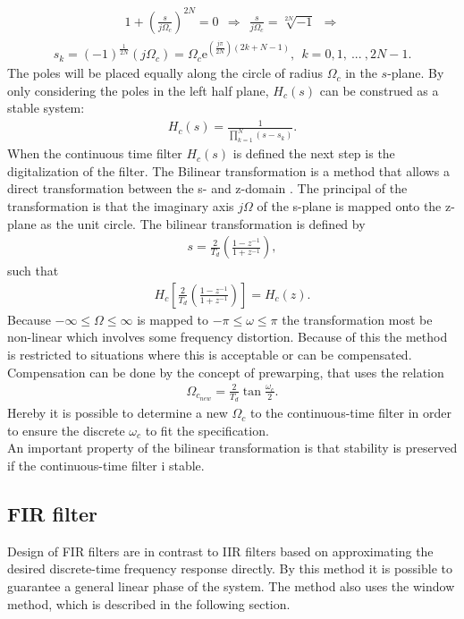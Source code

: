 \begin{align}
1+\left( \frac{s}{j\Omega_c}\right)^{2N} = 0 \ \  \Rightarrow  \ \ \frac{s}{j \Omega_c} = \sqrt[2N]{-1} \ \
\Rightarrow 
\end{align}
\begin{align}
s_k = (-1)^{\frac{1}{2N}}\left(j\Omega_c\right)=\Omega_c\text{e}^{\left(\frac{j\pi}{2N}\right)\left(2k+N-1\right)}, \ \ k=0,1,\ ... \ , 2N-1.
\end{align}   
The poles will be placed equally along the circle of radius $\Omega_c$ in the $s$-plane. By only considering the poles in the left half plane, $H_c(s)$ can be construed as a stable system:
\begin{align}
H_c(s)=\frac{1}{\prod_{k=1}^{N}(s-s_k)}.
\end{align}    
When the continuous time filter $H_c(s)$ is defined the next step is the digitalization of the filter.  The Bilinear transformation is a method that allows a direct transformation between the s- and z-domain . The principal of the transformation is that the imaginary axis $j\Omega$ of the s-plane is mapped onto the z-plane as the unit circle. The bilinear transformation is defined by 
\begin{align}
s=\frac{2}{T_d}\left(\frac{1-z^{-1}}{1+z^{-1}}\right), 
\end{align}
such that 
\begin{align}
H_c\left[\frac{2}{T_d}\left(\frac{1-z^{-1}}{1+z^{-1}}\right)\right]=H_c(z). 
\end{align}  
Because $-\infty \leq \Omega \leq \infty $ is mapped to $-\pi \leq \omega \leq \pi$ the transformation most be non-linear which involves some frequency distortion. Because of this the method is restricted to situations where this is acceptable or can be compensated. Compensation can be done by the concept of prewarping, that uses the relation 
\begin{align}
\Omega_{c_{new}}=\frac{2}{T_d}\tan\frac{\omega_c}{2}.
\end{align}
Hereby it is possible to determine a new $\Omega_c$ to the continuous-time filter in order to ensure the discrete $\omega_c$ to fit the specification.\\
An important property of the bilinear transformation is that stability is preserved if the continuous-time filter i stable.
\subsection{FIR filter}\label{subsec:FIR}
Design of FIR filters are in contrast to IIR filters based on approximating the desired discrete-time frequency response directly. By this method it is possible to guarantee a general linear phase of the system. The method also uses the window method, which is described in the following section.
